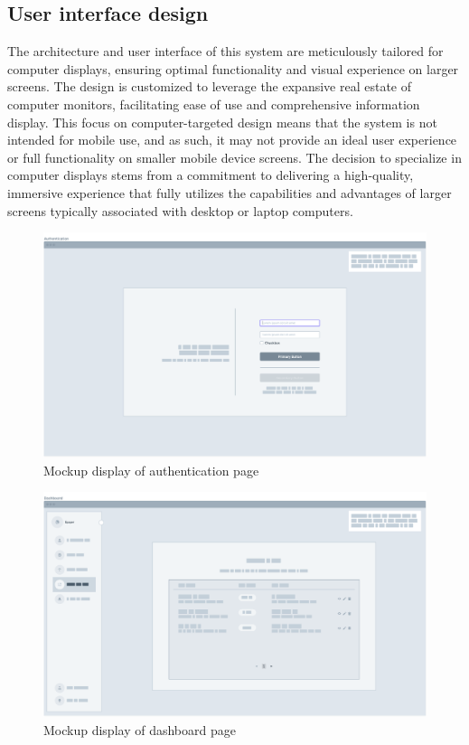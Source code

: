 \documentclass[../Main.tex]{subfiles}
\begin{document}
\subsection{User interface design}
The architecture and user interface of this system are meticulously tailored for computer displays, ensuring optimal functionality and visual experience on larger screens. The design is customized to leverage the expansive real estate of computer monitors, facilitating ease of use and comprehensive information display. This focus on computer-targeted design means that the system is not intended for mobile use, and as such, it may not provide an ideal user experience or full functionality on smaller mobile device screens. The decision to specialize in computer displays stems from a commitment to delivering a high-quality, immersive experience that fully utilizes the capabilities and advantages of larger screens typically associated with desktop or laptop computers.
\begin{figure}[H]
    \centering
    \includegraphics[scale=0.35]{doc/thesis/EN/imgs/mockup1.png}
    \caption{Mockup display of authentication page}
    \label{fig:Mockup1}
\end{figure}
\begin{figure}[H]
    \centering
    \includegraphics[scale=0.35]{doc/thesis/EN/imgs/mockup2.png}
    \caption{Mockup display of dashboard page}
    \label{fig:Mockup2}
\end{figure}
\end{document}
